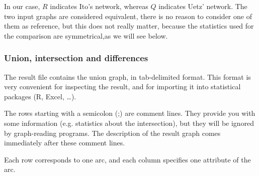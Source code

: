 In our case, $R$ indicates Ito's network, whereas $Q$ indicates Uetz'
network. The two input graphs are considered equivalent, there is no
reason to consider one of them as reference, but this does not really
matter, because the statistics used for the comparison are
symmetrical,as we will see below.

\subsubsection{Union, intersection and differences}

The result file contains the union graph, in tab-delimited
format. This format is very convenient for inspecting the result, and
for importing it into statistical packages (R, Excel, \ldots).

The rows starting with a semicolon (;) are comment lines. They provide
you with some information (e.g. statistics about the intersection),
but they will be ignored by graph-reading programs. The description of
the result graph comes immediately after these comment lines.

Each row corresponds to one arc, and each column specifies one
attribute of the arc.

